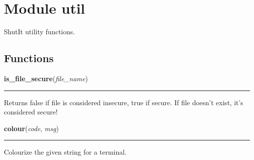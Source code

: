 %
%
%


\section{Module util}

    \label{util}
ShutIt utility functions.



  \subsection{Functions}

    \label{util:is_file_secure}

    \vspace{0.5ex}

\hspace{.8\funcindent}\begin{boxedminipage}{\funcwidth}

    \raggedright \textbf{is\_file\_secure}(\textit{file\_name})

    \vspace{-1.5ex}

    \rule{\textwidth}{0.5\fboxrule}
\setlength{\parskip}{2ex}
    Returns false if file is considered insecure, true if secure. If file 
    doesn't exist, it's considered secure!

\setlength{\parskip}{1ex}
    \end{boxedminipage}

    \label{util:colour}

    \vspace{0.5ex}

\hspace{.8\funcindent}\begin{boxedminipage}{\funcwidth}

    \raggedright \textbf{colour}(\textit{code}, \textit{msg})

    \vspace{-1.5ex}

    \rule{\textwidth}{0.5\fboxrule}
\setlength{\parskip}{2ex}
    Colourize the given string for a terminal.

\setlength{\parskip}{1ex}
    \end{boxedminipage}

